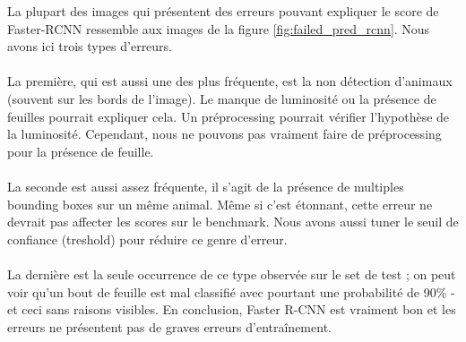 La plupart des images qui présentent des erreurs pouvant expliquer le score de Faster-RCNN ressemble aux images de la figure \ref{fig:failed_pred_rcnn}. 
Nous avons ici trois types d'erreurs. 
\paragraph{}
La première, qui est aussi une des plus fréquente, est la non détection d'animaux (souvent sur les bords de l'image). Le manque de luminosité ou la présence de feuilles pourrait expliquer cela. Un préprocessing pourrait vérifier l'hypothèse de la luminosité. Cependant, nous ne pouvons pas vraiment faire de préprocessing pour la présence de feuille.
\paragraph{}
La seconde est aussi assez fréquente, il s'agit de la présence de multiples bounding boxes sur un même animal. Même si c'est étonnant, cette erreur ne devrait pas affecter les scores sur le benchmark. Nous avons aussi tuner le seuil de confiance (treshold) pour réduire ce genre d'erreur.
\paragraph{}
La dernière est la seule occurrence de ce type observée sur le set de test ; on peut voir qu'un bout de feuille est mal classifié avec pourtant une probabilité de 90\% - et ceci sans raisons visibles.
En conclusion, Faster R-CNN est vraiment bon et les erreurs ne présentent pas de graves erreurs d'entraînement.

